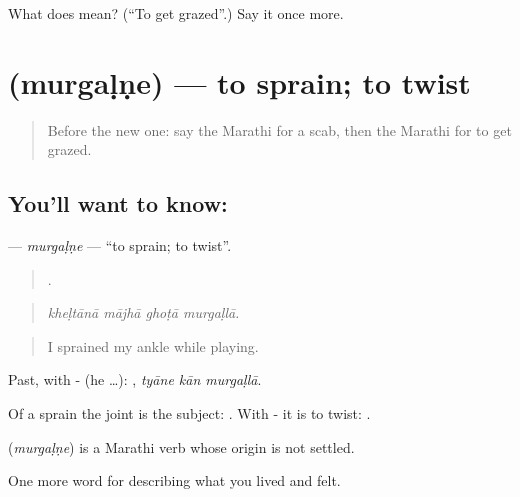 \begin{tcolorbox}[breakable,colback=teal!4,colframe=teal!35!black,title={Before you move on}]
What does  mean? (\textquotedblleft{}To get grazed\textquotedblright{}.) Say it once more.
\end{tcolorbox}
\section[\texorpdfstring{\mr{मुरगळणे} (murgaḷṇe)}{मुरगळणे (murgaḷṇe)}]{ (murgaḷṇe) — to sprain; to twist}

\label{lesson:MR-C486-murgalne}



\begin{quote}
Before the new one: say the Marathi for a scab, then the Marathi for to get grazed.
\end{quote}

\subsection*{You'll want to know: }
\textbf{} — \emph{murgaḷṇe} — \textquotedblleft{}to sprain; to twist\textquotedblright{}.

\begin{quote}
   .
\end{quote}

\begin{quote}
\emph{kheḷtānā mājhā ghoṭā murgaḷlā.}
\end{quote}

\begin{quote}
I sprained my ankle while playing.
\end{quote}

Past, with - (he …):   , \emph{tyāne kān murgaḷlā}.

Of a sprain the joint is the subject:   . With - it is to twist:  .

\begin{cousinweb}
\textbf{} (\emph{murgaḷṇe}) is a Marathi verb whose origin is not settled.
\end{cousinweb}

\begin{grammarlens}[title={What you've built}]
One more word for describing what you lived and felt.
\end{grammarlens}

